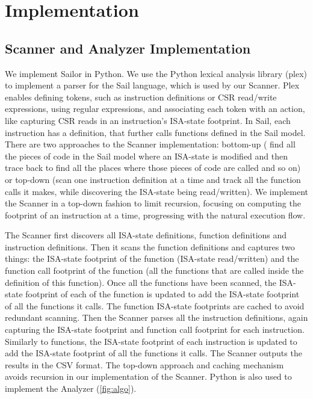 \section{Implementation}

\subsection{Scanner and Analyzer Implementation}
We implement Sailor in Python. 
We use the Python lexical analysis library (plex) \cite{plex} to implement a parser for the Sail language, which is used by our Scanner.
Plex enables defining tokens, such as instruction definitions or CSR read/write expressions, using regular expressions, and associating each token with an action, like capturing CSR reads in an instruction's ISA-state footprint.
In Sail, each instruction has a definition, that further calls functions defined in the Sail model.
There are two approaches to the Scanner implementation: bottom-up (\ie{} find all the pieces of code in the Sail model where an ISA-state is modified and then trace back to find all the places where those pieces of code are called and so on) or top-down (scan one instruction definition at a time and track all the function calls it makes, while discovering the ISA-state being read/written). 
We implement the Scanner in a top-down fashion to limit recursion, focusing on computing the footprint of an instruction at a time, progressing with the natural execution flow. 

The Scanner first discovers all ISA-state definitions, function definitions and instruction definitions. 
Then it scans the function definitions and captures two things: the ISA-state footprint of the function (ISA-state read/written) and the function call footprint of the function (all the functions that are called inside the definition of this function).
Once all the functions have been scanned, the ISA-state footprint of each of the function is updated to add the ISA-state footprint of all the functions it calls. 
The function ISA-state footprints are cached to avoid redundant scanning. 
Then the Scanner parses all the instruction definitions, again capturing the ISA-state footprint and function call footprint for each instruction.
Similarly to functions, the ISA-state footprint of each instruction is updated to add the ISA-state footprint of all the functions it calls. 
The Scanner outputs the results in the CSV format.
The top-down approach and caching mechanism avoids recursion in our implementation of the Scanner. 
Python is also used to implement the Analyzer (\autoref{fig:algo}). 
